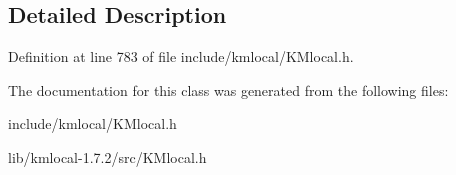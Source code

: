 \subsection{Detailed Description}


Definition at line 783 of file include/kmlocal/KMlocal.h.



The documentation for this class was generated from the following files:\begin{DoxyCompactItemize}
\item 
include/kmlocal/KMlocal.h\item 
lib/kmlocal-\/1.7.2/src/KMlocal.h\end{DoxyCompactItemize}
